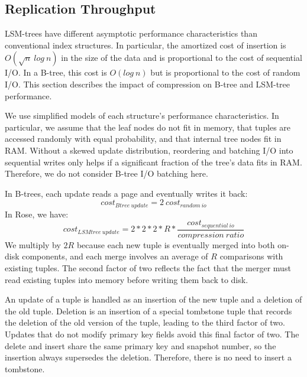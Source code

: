 \documentclass{vldb}
\newcommand{\rows}{Rose\xspace}
\begin{document}
\subsection{Replication Throughput}

LSM-trees have different asymptotic performance characteristics than
conventional index structures.  In particular, the amortized cost of
insertion is $O(\sqrt{n}~log~n)$ in the size of the data and is proportional
 to the cost of sequential I/O.  In a B-tree, this cost is
$O(log~n)$ but is proportional to the cost of random I/O.
This section describes the impact of compression on B-tree
and LSM-tree performance.

We use simplified models of each structure's performance
characteristics.  In particular, we assume that the leaf nodes do not
fit in memory, that tuples are accessed randomly with equal
probability, and that internal tree nodes fit in RAM.  Without a
skewed update distribution, reordering and batching I/O into
sequential writes only helps if a significant fraction of the tree's
data fits in RAM.  Therefore, we do not consider B-tree I/O batching
here.

In B-trees, each update reads a page and eventually writes it back:
\[
   cost_{Btree~update}=2~cost_{random~io}
\]
In \rows, we have:
\[
   cost_{LSMtree~update}=2*2*2*R*\frac{cost_{sequential~io}}{compression~ratio}  %
\]
We multiply by $2R$ because each new
tuple is eventually merged into both on-disk components, and
each merge involves an average of $R$ comparisons with existing tuples.
The second factor of two reflects the fact that the merger must read
existing tuples into memory before writing them back to disk.

An update of a tuple is handled as an insertion of the new
tuple and a deletion of the old tuple.  Deletion is an insertion
of a special tombstone tuple that records the deletion of the old version of the tuple, leading to the third factor of two.
Updates that do not modify primary key fields avoid this final factor
of two.  The delete and
insert share the same primary key and snapshot number, so the
insertion always supersedes the deletion.  Therefore, there is no
need to insert a tombstone.
\end{document}
